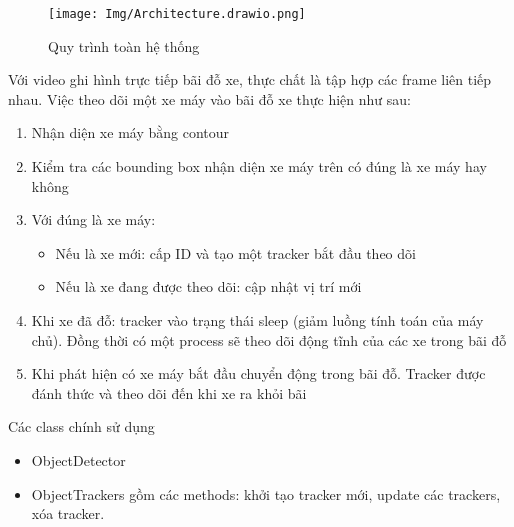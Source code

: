 \begin{figure}[H]
    \centering
    \texttt{[image: Img/Architecture.drawio.png]}
    \vspace{0.5cm}
    \caption{Quy trình toàn hệ thống}
\end{figure}
Với video ghi hình trực tiếp bãi đỗ xe, thực chất là tập hợp các frame liên tiếp nhau. Việc theo dõi một xe máy vào bãi đỗ xe thực hiện như sau:
\begin{enumerate}
    \item Nhận diện xe máy bằng contour
    \item Kiểm tra các bounding box nhận diện xe máy trên có đúng là xe máy hay không
    \item Với đúng là xe máy:
    \begin{itemize}
        \item Nếu là xe mới: cấp ID và tạo một tracker bắt đầu theo dõi
        \item Nếu là xe đang được theo dõi: cập nhật vị trí mới
    \end{itemize}
    \item Khi xe đã đỗ: tracker vào trạng thái sleep (giảm luồng tính toán của máy chủ). Đồng thời có một process sẽ theo dõi động tĩnh của các xe trong bãi đỗ
    \item Khi phát hiện có xe máy bắt đầu chuyển động trong bãi đỗ. Tracker được đánh thức và theo dõi đến khi xe ra khỏi bãi
\end{enumerate}

Các class chính sử dụng
\begin{itemize}
    \item ObjectDetector
    \item ObjectTrackers gồm các methods: khởi tạo tracker mới, update các trackers, xóa tracker.
\end{itemize}